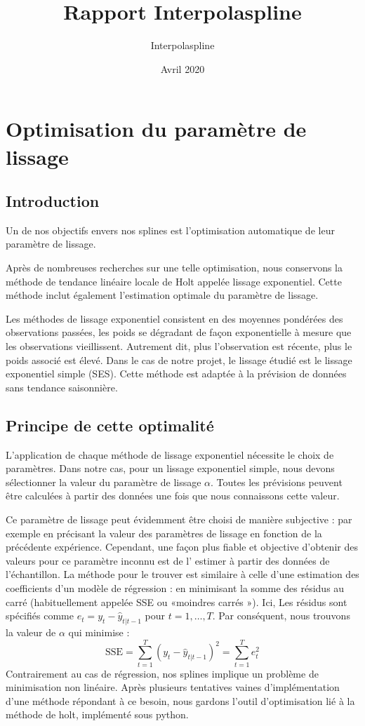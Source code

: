 \documentclass[a4paper,12pt]{article} %
\title{Rapport Interpolaspline}
\author{Interpolaspline}
\date{Avril 2020}
\begin{document}
 \maketitle

\section{Optimisation du paramètre de lissage}

\subsection{Introduction}

Un de nos objectifs envers nos splines est l'optimisation automatique de leur paramètre de lissage. 

Après de nombreuses recherches sur une telle optimisation, nous conservons la méthode de tendance linéaire locale de Holt appelée lissage exponentiel. Cette méthode inclut également l'estimation optimale du paramètre de lissage.

Les méthodes de lissage exponentiel  consistent en des moyennes pondérées des observations passées, les poids se dégradant de façon exponentielle à mesure que les observations vieillissent. Autrement dit, plus l’observation est récente, plus le poids associé est élevé. 
Dans le cas de notre projet, le lissage étudié est le lissage exponentiel simple (SES). Cette méthode est adaptée à la prévision de données sans tendance saisonnière. 

\subsection{Principe de cette optimalité}

L’application de chaque méthode de lissage exponentiel nécessite le choix de paramètres. Dans notre cas, pour un lissage exponentiel simple, nous devons sélectionner la valeur du paramètre de lissage  $\alpha$. Toutes les prévisions peuvent être calculées à partir des données une fois que nous connaissons cette valeur. 

Ce  paramètre de lissage peut évidemment être choisi de manière subjective : par exemple en précisant la valeur des paramètres de lissage en fonction de la précédente expérience. Cependant, une façon plus fiable et objective d’obtenir des valeurs pour ce paramètre inconnu est de l' estimer à partir des données de l'échantillon. La méthode pour le trouver est similaire à celle d'une estimation des  coefficients d’un modèle de régression :  en minimisant la somme des résidus au carré (habituellement appelée SSE ou «moindres carrés »).  Ici, Les résidus sont spécifiés comme $e_t=y_t - \hat{y}_{t|t-1}$ pour $t=1,\dots,T$. Par conséquent, nous trouvons la valeur de $\alpha$ qui minimise :
\begin{equation}
 \text{SSE}=\sum_{t=1}^T(y_t - \hat{y}_{t|t-1})^2=\sum_{t=1}^Te_t^2
\end{equation}
Contrairement au cas de régression, nos splines implique un problème de minimisation non linéaire.
Après plusieurs tentatives vaines d'implémentation d'une méthode répondant à ce besoin, nous gardons l'outil d’optimisation lié à la méthode de holt, implémenté sous python. 
     
\end{document}
